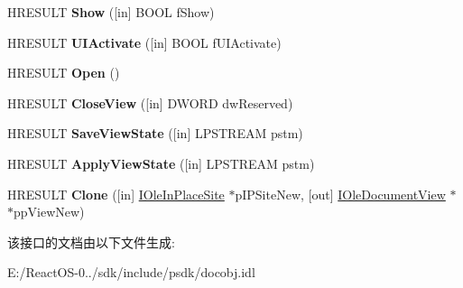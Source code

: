 \begin{DoxyCompactItemize}
\item 
\mbox{\label{interface_i_ole_document_view_a4e41364833c35669496f1a033c205e1c}} 
H\+R\+E\+S\+U\+LT {\bfseries Show} (\mbox{[}in\mbox{]} B\+O\+OL f\+Show)
\item 
\mbox{\label{interface_i_ole_document_view_aa6ea86f230b2b9cb05cf132c8b93b9d3}} 
H\+R\+E\+S\+U\+LT {\bfseries U\+I\+Activate} (\mbox{[}in\mbox{]} B\+O\+OL f\+U\+I\+Activate)
\item 
\mbox{\label{interface_i_ole_document_view_adfe7c9b0ebfd278f74e8d3e19e51dc07}} 
H\+R\+E\+S\+U\+LT {\bfseries Open} ()
\item 
\mbox{\label{interface_i_ole_document_view_aa0933049d1daf39a1bf8ca938018f3e8}} 
H\+R\+E\+S\+U\+LT {\bfseries Close\+View} (\mbox{[}in\mbox{]} D\+W\+O\+RD dw\+Reserved)
\item 
\mbox{\label{interface_i_ole_document_view_a32ae5ed2a0f287471fc446f4b949765e}} 
H\+R\+E\+S\+U\+LT {\bfseries Save\+View\+State} (\mbox{[}in\mbox{]} L\+P\+S\+T\+R\+E\+AM pstm)
\item 
\mbox{\label{interface_i_ole_document_view_a2639a375276281bdef9e8d7980b6c2f7}} 
H\+R\+E\+S\+U\+LT {\bfseries Apply\+View\+State} (\mbox{[}in\mbox{]} L\+P\+S\+T\+R\+E\+AM pstm)
\item 
\mbox{\label{interface_i_ole_document_view_a037e7562532300672a6e2c5136370715}} 
H\+R\+E\+S\+U\+LT {\bfseries Clone} (\mbox{[}in\mbox{]} \hyperlink{interface_i_ole_in_place_site}{I\+Ole\+In\+Place\+Site} $\ast$p\+I\+P\+Site\+New, \mbox{[}out\mbox{]} \hyperlink{interface_i_ole_document_view}{I\+Ole\+Document\+View} $\ast$$\ast$pp\+View\+New)
\end{DoxyCompactItemize}


该接口的文档由以下文件生成\+:\begin{DoxyCompactItemize}
\item 
E\+:/\+React\+O\+S-\/0../sdk/include/psdk/docobj.\+idl\end{DoxyCompactItemize}
